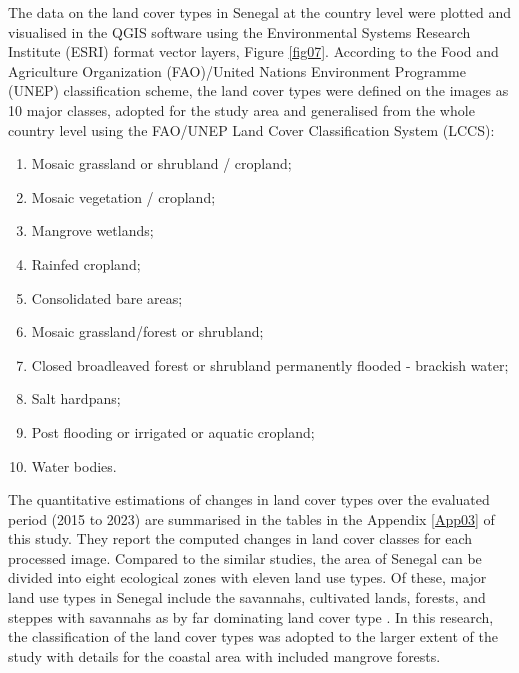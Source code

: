 \documentclass[land,article,submit,pdftex,moreauthors]{Definitions/mdpi}
\begin{document}
The data on the land cover types in Senegal at the country level were plotted and visualised in the QGIS software using the Environmental Systems Research Institute (ESRI) format vector layers, Figure \ref{fig07}. According to the Food and Agriculture Organization (FAO)/United Nations Environment Programme (UNEP) classification scheme, the land cover types were defined on the images as 10 major classes, adopted for the study area and generalised from the whole country level using the FAO/UNEP Land Cover Classification System (LCCS): 

 \begin{enumerate}
        \item Mosaic grassland or shrubland / cropland; 
        \item Mosaic vegetation / cropland; 
        \item Mangrove wetlands; 
        \item Rainfed cropland; 
        \item Consolidated bare areas;
        \item Mosaic grassland/forest or shrubland; 
        \item Closed broadleaved forest or shrubland permanently flooded - brackish water; 
        \item Salt hardpans; 
        \item Post flooding or irrigated or aquatic cropland; 
        \item Water bodies. 
\end{enumerate}

The quantitative estimations of changes in land cover types over the evaluated period (2015 to 2023) are summarised in the tables in the Appendix \ref{App03} of this study. They report the computed changes in land cover classes for each processed image. Compared to the similar studies, the area of Senegal can be divided into eight ecological zones with eleven land use types. Of these, major land use types in Senegal include the savannahs, cultivated lands, forests, and steppes with savannahs as by far dominating land cover type \cite{WOOMER2004625}. In this research, the classification of the land cover types was adopted to the larger extent of the study with details for the coastal area with included mangrove forests.
\end{document}
